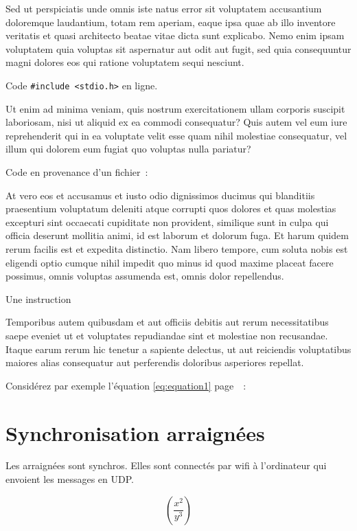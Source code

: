  
Sed ut perspiciatis unde omnis iste natus error sit voluptatem accusantium doloremque laudantium, totam rem aperiam, eaque ipsa quae ab illo inventore veritatis et quasi architecto beatae vitae dicta sunt explicabo. Nemo enim ipsam voluptatem quia voluptas sit aspernatur aut odit aut fugit, sed quia consequuntur magni dolores eos qui ratione voluptatem sequi nesciunt. 

Code \lstinline[style=sourceC]!#include <stdio.h>! en ligne.


Ut enim ad minima veniam, quis nostrum exercitationem ullam corporis suscipit laboriosam, nisi ut aliquid ex ea commodi consequatur? Quis autem vel eum iure reprehenderit qui in ea voluptate velit esse quam nihil molestiae consequatur, vel illum qui dolorem eum fugiat quo voluptas nulla pariatur?

Code en provenance d'un fichier~:

 

At vero eos et accusamus et iusto odio dignissimos ducimus qui blanditiis praesentium voluptatum deleniti atque corrupti quos dolores et quas molestias excepturi sint occaecati cupiditate non provident, similique sunt in culpa qui officia deserunt mollitia animi, id est laborum et dolorum fuga. Et harum quidem rerum facilis est et expedita distinctio. Nam libero tempore, cum soluta nobis est eligendi optio cumque nihil impedit quo minus id quod maxime placeat facere possimus, omnis voluptas assumenda est, omnis dolor repellendus. 

\begin{algorithm}[H]	
	Une instruction \\
	
\end{algorithm}


Temporibus autem quibusdam et aut officiis debitis aut rerum necessitatibus saepe eveniet ut et voluptates repudiandae sint et molestiae non recusandae. Itaque earum rerum hic tenetur a sapiente delectus, ut aut reiciendis voluptatibus maiores alias consequatur aut perferendis doloribus asperiores repellat.
			

Considérez par exemple l'équation \ref{eq:equation1} page~\pageref{eq:equation1}~:

		\section{Synchronisation arraignées}

Les arraignées sont synchros. Elles sont connectés par wifi à l'ordinateur qui envoient les messages en UDP.

\begin{equation}
\left(\frac{x^2}{y^3}\right)
\label{eq:equation1}
\end{equation}

\clearemptydoublepage

